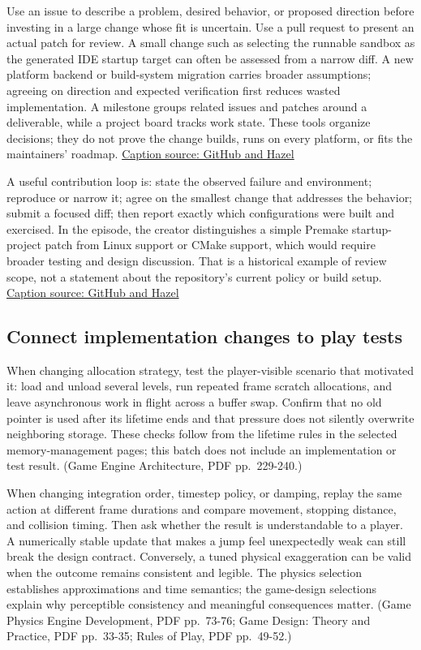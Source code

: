 Use an issue to describe a problem, desired behavior, or proposed direction before investing in a large change whose fit is uncertain. Use a pull request to present an actual patch for review. A small change such as selecting the runnable sandbox as the generated IDE startup target can often be assessed from a narrow diff. A new platform backend or build-system migration carries broader assumptions; agreeing on direction and expected verification first reduces wasted implementation. A milestone groups related issues and patches around a deliverable, while a project board tracks work state. These tools organize decisions; they do not prove the change builds, runs on every platform, or fits the maintainers' roadmap. \href{https://www.youtube.com/watch?v=DJEprZioFmU}{Caption source: GitHub and Hazel}

A useful contribution loop is: state the observed failure and environment; reproduce or narrow it; agree on the smallest change that addresses the behavior; submit a focused diff; then report exactly which configurations were built and exercised. In the episode, the creator distinguishes a simple Premake startup-project patch from Linux support or CMake support, which would require broader testing and design discussion. That is a historical example of review scope, not a statement about the repository's current policy or build setup. \href{https://www.youtube.com/watch?v=DJEprZioFmU}{Caption source: GitHub and Hazel}

\subsection{Connect implementation changes to play tests}\label{06-engine-ii-ch040-connect-implementation-changes-to-play-tests}

\hypertarget{06-engine-ii-ch040-connect-implementation-changes-to-play-tests}{}

When changing allocation strategy, test the player-visible scenario that motivated it: load and unload several levels, run repeated frame scratch allocations, and leave asynchronous work in flight across a buffer swap. Confirm that no old pointer is used after its lifetime ends and that pressure does not silently overwrite neighboring storage. These checks follow from the lifetime rules in the selected memory-management pages; this batch does not include an implementation or test result. (Game Engine Architecture, PDF pp.~229-240.)

When changing integration order, timestep policy, or damping, replay the same action at different frame durations and compare movement, stopping distance, and collision timing. Then ask whether the result is understandable to a player. A numerically stable update that makes a jump feel unexpectedly weak can still break the design contract. Conversely, a tuned physical exaggeration can be valid when the outcome remains consistent and legible. The physics selection establishes approximations and time semantics; the game-design selections explain why perceptible consistency and meaningful consequences matter. (Game Physics Engine Development, PDF pp.~73-76; Game Design: Theory and Practice, PDF pp.~33-35; Rules of Play, PDF pp.~49-52.)

